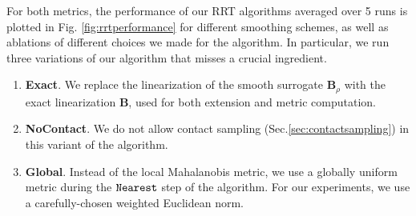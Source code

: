 For both metrics, the performance of our RRT algorithms averaged over 5 runs is plotted in Fig. \ref{fig:rrtperformance} for different smoothing schemes, as well as ablations of different choices we made for the algorithm. In particular, we run three variations of our algorithm that misses a crucial ingredient.
\begin{enumerate}
    \item \textbf{Exact}. We replace the linearization of the smooth surrogate $\mathbf{B}_\rho$ with the exact linearization $\mathbf{B}$, used for both extension and metric computation.
    \item \textbf{NoContact}. We do not allow contact sampling (Sec.\ref{sec:contactsampling}) in this variant of the algorithm.
    \item \textbf{Global}. Instead of the local Mahalanobis metric, we use a globally uniform metric during the $\mathtt{Nearest}$ step of the algorithm. For our experiments, we use a carefully-chosen weighted Euclidean norm. 
\end{enumerate}


